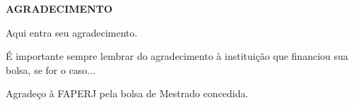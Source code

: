 \begin{center}
\textbf{AGRADECIMENTO}
\end{center}

$\!$\\

Aqui entra seu agradecimento.

É importante sempre lembrar do agradecimento à instituição que financiou sua bolsa, se for o caso...

Agradeço à FAPERJ pela bolsa de Mestrado concedida. 